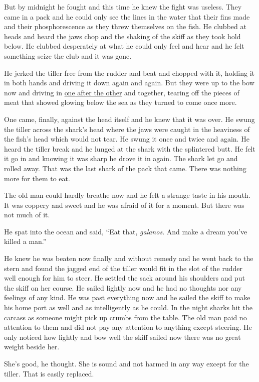 \documentclass[fontset=ubuntu,zihao=-4]{ctexrep}
\begin{document}
But by midnight he fought and this time he knew the fight was \gls{useless}.
They came in a pack and he could only see the lines in the water that their
fins made and their phosphorescence as they threw themselves on the fish. He
clubbed at heads and heard the jaws chop and the shaking of the skiff as
they took hold below. He clubbed desperately at what he could only feel and
hear and he felt something \gls{seize} the club and it was gone.

He jerked the tiller free from the rudder and beat and chopped with it,
holding it in both hands and driving it down again and again. But they were
up to the bow now and driving in \uline{one after the other} and together,
\gls{tearing} off the pieces of meat that showed glowing below the sea as they
turned to come once more.

One came, finally, against the head itself and he knew that it was over. He
swung the tiller across the shark's head where the jaws were caught in the
heaviness of the fish's head which would not \gls{tear}. He swung it once and
twice and again. He heard the tiller break and he \gls{lunged} at the shark
with the \gls{splintered} butt. He felt it go in and knowing it was sharp he
drove it in again. The shark let go and rolled away. That was the last shark
of the \gls{pack} that came. There was nothing more for them to eat.

The old man could hardly breathe now and he felt a strange taste in his
mouth. It was \gls{coppery} and sweet and he was afraid of it for a moment.
But there was not much of it.

He \gls{spat} into the ocean and said, ``Eat that, \emph{galanos}. And make a dream
you've killed a man.''

He knew he was beaten now finally and without \gls{remedy} and he went back
to the stern and found the \gls{jagged} end of the tiller would \gls{fit} in
the slot of the \gls{rudder} well enough for him to steer. He settled the
sack around his shoulders and put the skiff on her course. He sailed lightly
now and he had no thoughts nor any feelings of any kind. He was past
everything now and he sailed the skiff to make his home port as well and as
intelligently as he could. In the night sharks hit the carcass as someone
might pick up \glspl{crumb} from the table. The old man paid no attention to
them and did not pay any attention to anything except steering. He only
noticed how lightly and bow well the skiff sailed now there was no great
weight beside her.

She's good, he thought. She is sound and not harmed in any way except for
the tiller. That is easily replaced.
\end{document}
